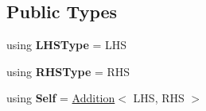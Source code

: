 \subsection*{Public Types}
\begin{DoxyCompactItemize}
\item 
\hypertarget{classlatex_1_1math_1_1Addition_aaea872c65a92e8d4b30947abe9908517}{using {\bfseries L\-H\-S\-Type} = L\-H\-S}\label{classlatex_1_1math_1_1Addition_aaea872c65a92e8d4b30947abe9908517}

\item 
\hypertarget{classlatex_1_1math_1_1Addition_a0fe2a62eec58bbfd834b631f06c601c5}{using {\bfseries R\-H\-S\-Type} = R\-H\-S}\label{classlatex_1_1math_1_1Addition_a0fe2a62eec58bbfd834b631f06c601c5}

\item 
\hypertarget{classlatex_1_1math_1_1Addition_ac09b52f17f976ceef97ed19c2777c4a0}{using {\bfseries Self} = \hyperlink{classlatex_1_1math_1_1Addition}{Addition}$<$ L\-H\-S, R\-H\-S $>$}\label{classlatex_1_1math_1_1Addition_ac09b52f17f976ceef97ed19c2777c4a0}

\end{DoxyCompactItemize}
